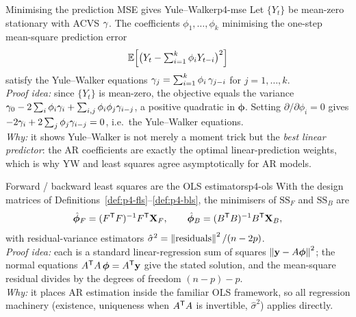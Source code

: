 \begin{proposition}{Minimising the prediction MSE gives Yule--Walker}{p4-mse}
Let $\{Y_t\}$ be mean-zero stationary with ACVS $\gamma$. The coefficients
$\phi_1,\dots,\phi_k$ minimising the one-step mean-square prediction error
\[
\mathbb{E}\Big[\big(Y_t-\textstyle\sum_{i=1}^k\phi_iY_{t-i}\big)^2\Big]
\]
satisfy the Yule--Walker equations $\gamma_j=\sum_{i=1}^k\phi_i\,\gamma_{j-i}$ for
$j=1,\dots,k$.\\[2pt]
\textit{Proof idea:} since $\{Y_t\}$ is mean-zero, the objective equals the
variance
$\gamma_0-2\sum_i\phi_i\gamma_i+\sum_{i,j}\phi_i\phi_j\gamma_{i-j}$, a positive
quadratic in $\boldsymbol\phi$. Setting $\partial/\partial\phi_i=0$ gives
$-2\gamma_i+2\sum_j\phi_j\gamma_{i-j}=0$, i.e.\ the Yule--Walker equations.\\
\textit{Why:} it shows Yule--Walker is not merely a moment trick but the
\emph{best linear predictor}: the AR coefficients are exactly the optimal
linear-prediction weights, which is why YW and least squares agree
asymptotically for AR models.
\end{proposition}

\begin{proposition}{Forward / backward least squares are the OLS estimators}{p4-ols}
With the design matrices of Definitions~\ref{def:p4-fls}--\ref{def:p4-bls}, the
minimisers of $\mathrm{SS}_F$ and $\mathrm{SS}_B$ are
\[
\hat{\boldsymbol\phi}_F=(F^{\mathsf{T}} F)^{-1}F^{\mathsf{T}}\mathbf X_F,
\qquad
\hat{\boldsymbol\phi}_B=(B^{\mathsf{T}} B)^{-1}B^{\mathsf{T}}\mathbf X_B,
\]
with residual-variance estimators
$\hat\sigma^2=\left\lVert \text{residuals} \right\rVert^2/(n-2p)$.\\[2pt]
\textit{Proof idea:} each is a standard linear-regression sum of squares
$\left\lVert \mathbf y-A\boldsymbol\phi \right\rVert^2$; the normal equations
$A^{\mathsf{T}} A\,\boldsymbol\phi=A^{\mathsf{T}}\mathbf y$ give the stated solution, and the
mean-square residual divides by the degrees of freedom $(n-p)-p$.\\
\textit{Why:} it places AR estimation inside the familiar OLS framework, so all
regression machinery (existence, uniqueness when $A^{\mathsf{T}} A$ is invertible,
$\hat\sigma^2$) applies directly.
\end{proposition}

